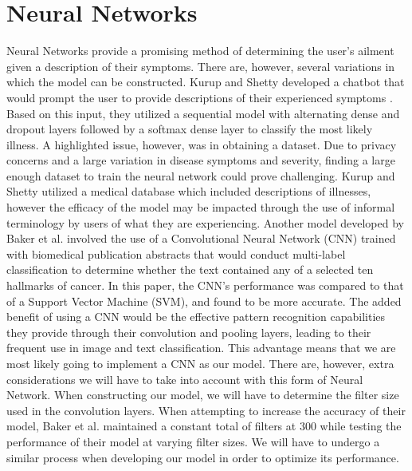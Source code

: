 \documentclass[12pt, final, onecolumn, comsoc, conference]{IEEEtran}
\begin{document}
\section{Neural Networks} Neural Networks provide a promising method of
determining the user’s ailment given a description of their symptoms. There are,
however, several variations in which the model can be constructed. Kurup and
Shetty developed a chatbot that would prompt the user to provide descriptions of
their experienced symptoms \cite{10.1007/978-981-16-2543-5_22}. Based on this input, they utilized a sequential
model with alternating dense and dropout layers followed by a softmax dense
layer to classify the most likely illness. A highlighted issue, however, was in
obtaining a dataset. Due to privacy concerns and a large variation in disease
symptoms and severity, finding a large enough dataset to train the neural
network could prove challenging. Kurup and Shetty \cite{10.1007/978-981-16-2543-5_22} utilized a medical
database which included descriptions of illnesses, however the efficacy of the
model may be impacted through the use of informal terminology by users of what
they are experiencing. Another model developed by Baker et al. \cite{baker-etal-2016-cancer} involved the
use of a Convolutional Neural Network (CNN) trained with biomedical publication
abstracts that would conduct multi-label classification to determine whether the
text contained any of a selected ten hallmarks of cancer. In this paper, the
CNN’s performance was compared to that of a Support Vector Machine (SVM), and
found to be more accurate. The added benefit of using a CNN would be the
effective pattern recognition capabilities they provide through their
convolution and pooling layers, leading to their frequent use in image and text
classification. This advantage means that we are most likely going to implement
a CNN as our model. There are, however, extra considerations we will have to
take into account with this form of Neural Network. When constructing our model,
we will have to determine the filter size used in the convolution layers. When
attempting to increase the accuracy of their model, Baker et al. maintained a
constant total of filters at 300 while testing the performance of their model at
varying filter sizes. We will have to undergo a similar process when developing
our model in order to optimize its performance.
\end{document}
